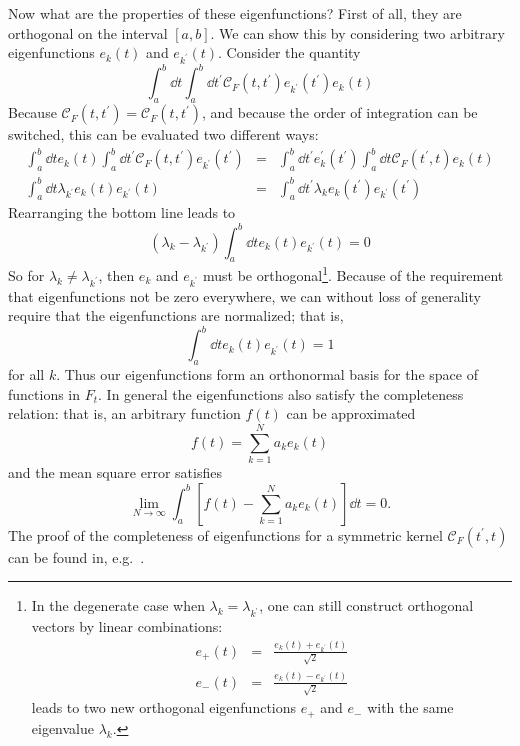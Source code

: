 Now what are the properties of these eigenfunctions?  First of all, they
are orthogonal on the interval $[a, b]$.
We can show this by considering two arbitrary eigenfunctions
$e_k(t)$ and $e_{k^\prime}(t)$.  Consider the quantity
\begin{equation}
  \int_a^b \dd t \int_a^b \dd t^\prime \mathcal{C}_F(t, t^\prime)
  e_{k^\prime}(t^\prime) e_k(t)
\end{equation}
Because $\mathcal{C}_F(t, t^\prime) = \mathcal{C}_F(t, t^\prime)$, and
because the order of integration can be switched, this can be evaluated
two different ways:
\begin{eqnarray}
  \int_a^b \dd t e_k(t)
  \int_a^b \dd t^\prime \mathcal{C}_F(t, t^\prime) e_{k^\prime}(t^\prime) &=&
  \int_a^b \dd t^\prime e_k^\prime(t^\prime)
  \int_a^b \dd t \mathcal{C}_F(t^\prime, t) e_{k}(t)
  \nonumber\\
  \int_a^b \dd t \lambda_{k^\prime} e_k(t) e_{k^\prime}(t) &=&
  \int_a^b \dd t^\prime \lambda_k e_k(t^\prime) e_{k^\prime}(t^\prime)
\end{eqnarray}
Rearranging the bottom line leads to
\begin{equation}
  (\lambda_k - \lambda_{k^\prime})
  \int_a^b \dd t e_k(t) e_{k^\prime}(t) = 0
\end{equation}
So for $\lambda_k \ne \lambda_{k^\prime}$, then $e_k$ and $e_{k^\prime}$
must be orthogonal\footnote{In the degenerate case when
$\lambda_k = \lambda_{k^\prime}$, one can still construct orthogonal
vectors by linear combinations:
\begin{eqnarray}
  e_+(t) &=& \frac{e_k(t) + e_{k^\prime}(t)}{\sqrt{2}} \nonumber\\
  e_-(t) &=& \frac{e_k(t) - e_{k^\prime}(t)}{\sqrt{2}} \nonumber
\end{eqnarray}
leads to two new orthogonal eigenfunctions $e_+$ and $e_-$ with the
same eigenvalue $\lambda_k$.}.  Because of the
requirement that eigenfunctions not be zero everywhere, we can without
loss of generality require that the eigenfunctions are normalized; that
is,
\begin{equation}
  \int_a^b \dd t e_k(t) e_{k^\prime}(t) = 1
\end{equation}
for all $k$.  Thus our eigenfunctions form an orthonormal basis for 
the space of functions in $F_t$.  In general the eigenfunctions
also satisfy the completeness relation: that is, 
an arbitrary function $f(t)$ can be approximated
\begin{equation}
  f(t) = \sum_{k=1}^N a_k e_k(t)
\end{equation}
and the mean square error satisfies
\begin{equation}
  \lim_{N\to\infty} \int_a^b
  \left[f(t) - \sum_{k=1}^{N}a_k e_k(t)\right]\dd t = 0.
\end{equation}
The proof of the completeness of eigenfunctions for a symmetric kernel
$\mathcal{C}_F(t^\prime, t)$ can be found in, e.g.~\citet{Courant1989}.

